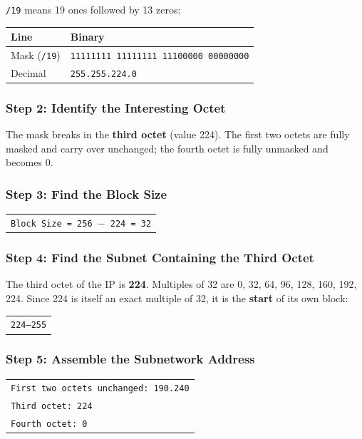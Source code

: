 \documentclass[11pt,a4paper]{article}
\begin{document}
\texttt{/19} means 19 ones followed by 13 zeros:

\begin{tabularx}{\textwidth}{@{}lX@{}}
\toprule
\rowcolor{tablehead}\textbf{Line} & \textbf{Binary} \\
\midrule
Mask (\texttt{/19}) & \texttt{11111111 11111111 11100000 00000000} \\
Decimal & \texttt{255.255.224.0} \\
\bottomrule
\end{tabularx}

\subsubsection*{Step 2: Identify the Interesting Octet}

The mask breaks in the \textbf{third octet} (value 224). The first two octets are
fully masked and carry over unchanged; the fourth octet is fully unmasked and
becomes 0.

\subsubsection*{Step 3: Find the Block Size}

\begin{tabularx}{\textwidth}{@{}X@{}}
\texttt{Block Size = 256 $-$ 224 = 32} \\
\end{tabularx}

\subsubsection*{Step 4: Find the Subnet Containing the Third Octet}

The third octet of the IP is \textbf{224}. Multiples of 32 are 0, 32, 64, 96,
128, 160, 192, 224. Since 224 is itself an exact multiple of 32, it is the
\textbf{start} of its own block:

\begin{tabularx}{\textwidth}{@{}X@{}}
\texttt{224--255} \\
\end{tabularx}

\subsubsection*{Step 5: Assemble the Subnetwork Address}

\begin{tabularx}{\textwidth}{@{}X@{}}
\texttt{First two octets unchanged: 190.240} \\
\texttt{Third octet: 224} \\
\texttt{Fourth octet: 0} \\
\end{tabularx}
\end{document}
